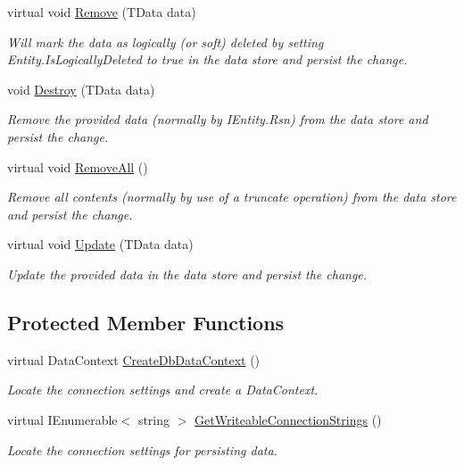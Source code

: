 \begin{DoxyCompactItemize}
virtual void \hyperlink{classCqrs_1_1DataStores_1_1SqlDataStore_a898d15db199f054865a96ac646bf54fb_a898d15db199f054865a96ac646bf54fb}{Remove} (T\+Data data)
\begin{DoxyCompactList}\small\item\em Will mark the {\itshape data}  as logically (or soft) deleted by setting Entity.\+Is\+Logically\+Deleted to true in the data store and persist the change. \end{DoxyCompactList}\item 
void \hyperlink{classCqrs_1_1DataStores_1_1SqlDataStore_a5ec396c9eb202c8de931c1546c721ca3_a5ec396c9eb202c8de931c1546c721ca3}{Destroy} (T\+Data data)
\begin{DoxyCompactList}\small\item\em Remove the provided {\itshape data}  (normally by I\+Entity.\+Rsn) from the data store and persist the change. \end{DoxyCompactList}\item 
virtual void \hyperlink{classCqrs_1_1DataStores_1_1SqlDataStore_abb88337dccf3d5372f6b0920d5d26ebd_abb88337dccf3d5372f6b0920d5d26ebd}{Remove\+All} ()
\begin{DoxyCompactList}\small\item\em Remove all contents (normally by use of a truncate operation) from the data store and persist the change. \end{DoxyCompactList}\item 
virtual void \hyperlink{classCqrs_1_1DataStores_1_1SqlDataStore_a8f85191cecef92d003620d4064584bb2_a8f85191cecef92d003620d4064584bb2}{Update} (T\+Data data)
\begin{DoxyCompactList}\small\item\em Update the provided {\itshape data}  in the data store and persist the change. \end{DoxyCompactList}\end{DoxyCompactItemize}
\subsection*{Protected Member Functions}
\begin{DoxyCompactItemize}
\item 
virtual Data\+Context \hyperlink{classCqrs_1_1DataStores_1_1SqlDataStore_a8458af970314deef8eff6a4783b1c46f_a8458af970314deef8eff6a4783b1c46f}{Create\+Db\+Data\+Context} ()
\begin{DoxyCompactList}\small\item\em Locate the connection settings and create a Data\+Context. \end{DoxyCompactList}\item 
virtual I\+Enumerable$<$ string $>$ \hyperlink{classCqrs_1_1DataStores_1_1SqlDataStore_a091f7762de79cb2d488c2baafbb71476_a091f7762de79cb2d488c2baafbb71476}{Get\+Writeable\+Connection\+Strings} ()
\begin{DoxyCompactList}\small\item\em Locate the connection settings for persisting data. \end{DoxyCompactList}\end{DoxyCompactItemize}
